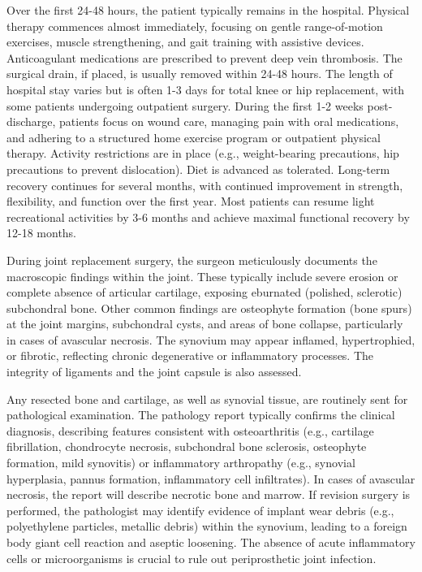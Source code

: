 Over the first 24-48 hours, the patient typically remains in the hospital. Physical therapy commences almost immediately, focusing on gentle range-of-motion exercises, muscle strengthening, and gait training with assistive devices. Anticoagulant medications are prescribed to prevent deep vein thrombosis. The surgical drain, if placed, is usually removed within 24-48 hours. The length of hospital stay varies but is often 1-3 days for total knee or hip replacement, with some patients undergoing outpatient surgery. During the first 1-2 weeks post-discharge, patients focus on wound care, managing pain with oral medications, and adhering to a structured home exercise program or outpatient physical therapy. Activity restrictions are in place (e.g., weight-bearing precautions, hip precautions to prevent dislocation). Diet is advanced as tolerated. Long-term recovery continues for several months, with continued improvement in strength, flexibility, and function over the first year. Most patients can resume light recreational activities by 3-6 months and achieve maximal functional recovery by 12-18 months.

During joint replacement surgery, the surgeon meticulously documents the macroscopic findings within the joint. These typically include severe erosion or complete absence of articular cartilage, exposing eburnated (polished, sclerotic) subchondral bone. Other common findings are osteophyte formation (bone spurs) at the joint margins, subchondral cysts, and areas of bone collapse, particularly in cases of avascular necrosis. The synovium may appear inflamed, hypertrophied, or fibrotic, reflecting chronic degenerative or inflammatory processes. The integrity of ligaments and the joint capsule is also assessed.

Any resected bone and cartilage, as well as synovial tissue, are routinely sent for pathological examination. The pathology report typically confirms the clinical diagnosis, describing features consistent with osteoarthritis (e.g., cartilage fibrillation, chondrocyte necrosis, subchondral bone sclerosis, osteophyte formation, mild synovitis) or inflammatory arthropathy (e.g., synovial hyperplasia, pannus formation, inflammatory cell infiltrates). In cases of avascular necrosis, the report will describe necrotic bone and marrow. If revision surgery is performed, the pathologist may identify evidence of implant wear debris (e.g., polyethylene particles, metallic debris) within the synovium, leading to a foreign body giant cell reaction and aseptic loosening. The absence of acute inflammatory cells or microorganisms is crucial to rule out periprosthetic joint infection.

